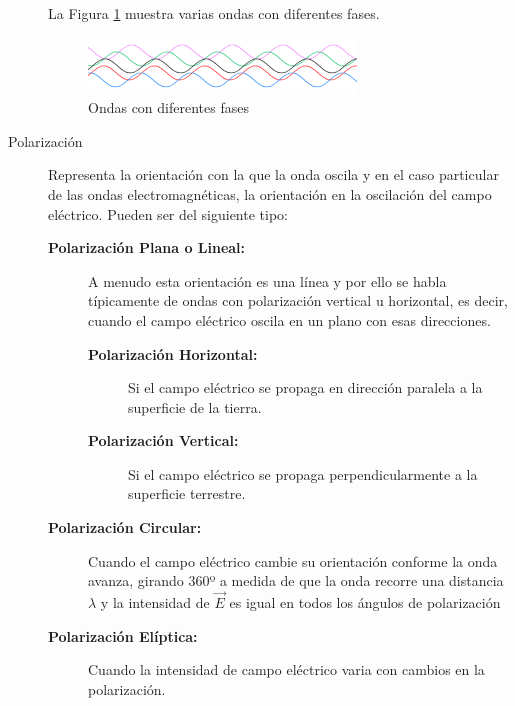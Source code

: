 \begin{description}
La Figura \ref{fig:desfase-ondas} muestra varias ondas con diferentes fases. 

\begin{figure}[!h]
  \centering
  \includegraphics[width=0.7\textwidth]{06.radionavegacion/Imagenes/06.01.adf/desfase-ondas.png}
  \caption{Ondas con diferentes fases \protect\cite{wikipedia_esp}}
  \label{fig:desfase-ondas}
\end{figure}



\item [Polarizaci\'on] Representa la orientaci\'on con la que la onda oscila y en el caso particular de las ondas electromagn\'eticas, la orientaci\'on en la oscilaci\'on del campo el\'ectrico. 
Pueden ser del siguiente tipo:

\begin{description}
\item[\bf Polarizaci\'on Plana o Lineal:] A menudo esta orientaci\'on es una l\'inea y por ello se habla t\'ipicamente de ondas con polarizaci\'on vertical u horizontal, es decir, cuando el campo el\'ectrico oscila en un plano con esas direcciones.
  \begin{description}
  \item[\bf Polarizaci\'on Horizontal:] Si el campo eléctrico se propaga en dirección paralela a la superficie de la tierra.
  \item[\bf Polarizaci\'on Vertical:] Si el campo eléctrico se propaga perpendicularmente a la superficie terrestre.
  \end{description}

\item[\bf Polarizaci\'on Circular:] Cuando el campo el\'ectrico cambie su orientaci\'on conforme la onda avanza, girando 360º a medida de que la onda recorre una distancia $\lambda$ y la intensidad de $\vec{E}$ es igual en todos los \'angulos de polarizaci\'on

\item[\bf Polarizaci\'on El\'iptica:] Cuando la intensidad de campo eléctrico varia con cambios en la polarización.

\end{description}


\end{description}
